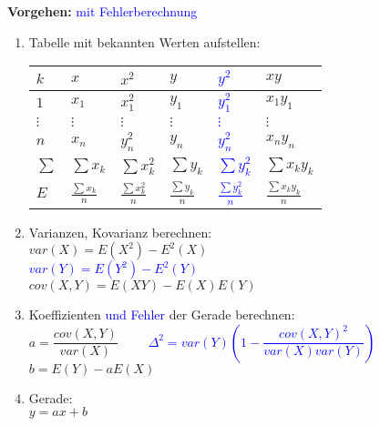 \begin{minipage}[t]{10cm}
  \textbf{Vorgehen:}
  \textcolor{blue}{mit Fehlerberechnung}
	\begin{enumerate}
		\item Tabelle mit bekannten Werten aufstellen:\\
  		\begin{tabular}{|l||l|l||l|l||l|}
  		  \hline
        \textbf{$k$} & \textbf{$x$} & \textbf{$x^2$} & \textbf{$y$} &
  		  \textcolor{blue}{\textbf{$y^2$}} & \textbf{$xy$} \\
  		  \hline \hline
  		  $1$ & $x_1$ & $x_1^2$ & $y_1$ & \textcolor{blue}{$y_1^2$} & $x_1y_1$ \\
  		  \hline
  		  $\vdots$ & $\vdots$ & $\vdots$ & $\vdots$ & \textcolor{blue}{$\vdots$} &
  		  $\vdots$ \\\hline $n$ & $x_n$ & $y_n^2$ & $y_n$ & \textcolor{blue}{$y_n^2$} & $x_ny_n$ \\
  		  \hline
  		  \hline
  		  $\sum$ & $\sum x_k$ & $\sum x_k^2$ & $\sum y_k$ & \textcolor{blue}{$\sum
  		  y_k^2$} & $\sum x_ky_k$ \\
  		  \hline $E$ & $\frac{\sum x_k}{n}$ & $\frac{\sum x_k^2}{n}$ & $\frac{\sum
  		  y_k}{n}$ & \textcolor{blue}{$\frac{\sum y_k^2}{n}$} & $\frac{\sum x_ky_k}{n}$ \\
  		  \hline
  		\end{tabular} 
		\item Varianzen, Kovarianz berechnen: \\
		  $var(X) = E(X^2) - E^2(X)$ \\
		  \textcolor{blue}{$var(Y) = E(Y^2) - E^2(Y)$} \\
		  $cov(X,Y) = E(XY) - E(X)E(Y)$
		\item Koeffizienten \textcolor{blue}{und Fehler} der Gerade berechnen: \\
		  $a=\dfrac{cov(X,Y)}{var(X)}$
		  \textcolor{blue}{$\qquad\Delta^2=var(Y)\left(1-\dfrac{cov(X,Y)^2}
		  {var(X)var(Y)}\right) $} \\
		  $b=E(Y)-aE(X)$
		\item Gerade: \\
		$y=ax+b$
	\end{enumerate}
\end{minipage}
